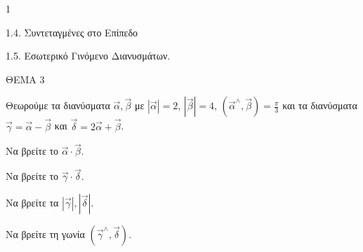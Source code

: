 \begin{ylh}{1}
    \item 1.4. Συντεταγμένες στο Επίπεδο
    \item 1.5. Εσωτερικό Γινόμενο Διανυσμάτων.
\end{ylh}
ΘΕΜΑ 3

Θεωρούμε τα διανύσματα $\vec{\alpha}, \vec{\beta}$ με $|\vec{\alpha}|=2$, $|\vec{\beta}|=4$, $(\vec{\alpha}^{\wedge}, \vec{\beta})=\frac{\pi}{3}$ και τα διανύσματα $\vec{\gamma}=\vec{\alpha}-\vec{\beta}$ και $\vec{\delta}=2\vec{\alpha}+\vec{\beta}$.
\begin{alist}
\item Να βρείτε το $\vec{\alpha} \cdot \vec{\beta}$. 
\item Να βρείτε το $\vec{\gamma} \cdot \vec{\delta}$. 
\item Να βρείτε τα $|\vec{\gamma}|, |\vec{\delta}|$. 
\item Να βρείτε τη γωνία $(\vec{\gamma}^{\wedge}, \vec{\delta})$. 
\end{alist}